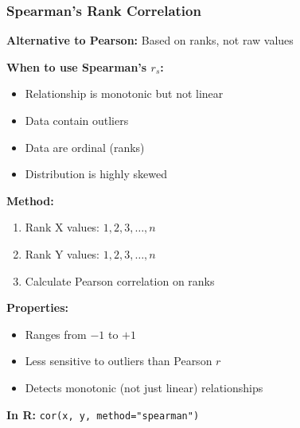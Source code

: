 \documentclass{beamer}
\begin{document}
\begin{frame}
\frametitle{Spearman's Rank Correlation}
\textbf{Alternative to Pearson:} Based on ranks, not raw values

\vspace{0.3cm}
\textbf{When to use Spearman's $r_s$:}
\begin{itemize}
\item Relationship is monotonic but not linear
\item Data contain outliers
\item Data are ordinal (ranks)
\item Distribution is highly skewed
\end{itemize}

\vspace{0.3cm}
\textbf{Method:}
\begin{enumerate}
\item Rank X values: $1, 2, 3, \ldots, n$
\item Rank Y values: $1, 2, 3, \ldots, n$
\item Calculate Pearson correlation on ranks
\end{enumerate}

\vspace{0.3cm}
\textbf{Properties:}
\begin{itemize}
\item Ranges from $-1$ to $+1$
\item Less sensitive to outliers than Pearson $r$
\item Detects monotonic (not just linear) relationships
\end{itemize}

\vspace{0.3cm}
\textbf{In R:} \texttt{cor(x, y, method="spearman")}
\end{frame}
\end{document}

